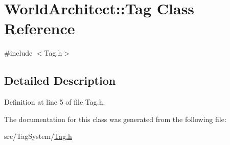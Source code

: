 \hypertarget{class_world_architect_1_1_tag}{}\section{World\+Architect\+::Tag Class Reference}
\label{class_world_architect_1_1_tag}


{\ttfamily \#include $<$Tag.\+h$>$}



\subsection{Detailed Description}


Definition at line 5 of file Tag.\+h.



The documentation for this class was generated from the following file\+:\begin{DoxyCompactItemize}
\item 
src/\+Tag\+System/\mbox{\hyperlink{_tag_8h}{Tag.\+h}}\end{DoxyCompactItemize}
